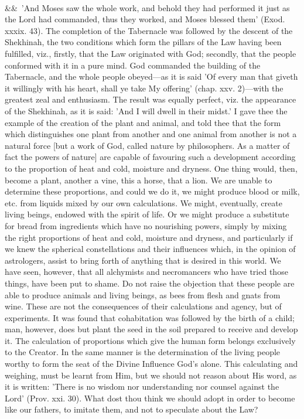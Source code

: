\documentclass[12pt]{article}
\newcommand{\para}[1][]{\par\noindent\ifx&#1&\else\textsuperscript{\footnotesize #1}~\fi}
\begin{document}
\para 'And Moses saw the whole work, and behold they had performed it just as the Lord had commanded, thus they worked, and Moses blessed them' (Exod. xxxix. 43). The completion of the Tabernacle was followed by the descent of the Shekhinah, the two conditions which form the pillars of the Law having been fulfilled, viz., firstly, that the Law originated with God; secondly, that the people conformed with it in a pure mind. God commanded the building of the Tabernacle, and the whole people obeyed---as it is said 'Of every man that giveth it willingly with his heart, shall ye take My offering' (chap. xxv. 2)---with the greatest zeal and enthusiasm. The result was equally perfect, viz. the appearance of the Shekhinah, as it is said: 'And I will dwell in their midst.' I gave thee the example of the creation of the plant and animal, and told thee that the form which distinguishes one plant from another and one animal from another is not a natural force [but a work of God, called nature by philosophers. As a matter of fact the powers of nature] are capable of favouring such a development according to the proportion of heat and cold, moisture and dryness. One thing would, then, become a plant, another a vine, this a horse, that a lion. We are unable to determine these proportions, and could we do it, we might produce blood or milk, etc. from liquids mixed by our own calculations. We might, eventually, create living beings, endowed with the spirit of life. Or we might produce a substitute for bread from ingredients which have no nourishing powers, simply by mixing the right proportions of heat and cold, moisture and dryness, and particularly if we knew the spherical constellations and their influences which, in the opinion of astrologers, assist to bring forth of anything that is desired in this world. We have seen, however, that all alchymists and necromancers who have tried those things, have been put to shame. Do not raise the objection that these people are able to produce animals and living beings, as bees from flesh and gnats from wine. These are not the consequences of their calculations and agency, but of experiments. It was found that cohabitation was followed by the birth of a child; man, however, does but plant the seed in the soil prepared to receive and develop it. The calculation of proportions which give the human form belongs exclusively to the Creator. In the same manner is the determination of the living people worthy to form the seat of the Divine Influence God's alone. This calculating and weighing, must be learnt from Him, but we should not reason about His word, as it is written: 'There is no wisdom nor understanding nor counsel against the Lord' (Prov. xxi. 30). What dost thou think we should adopt in order to become like our fathers, to imitate them, and not to speculate about the Law?
\end{document}
